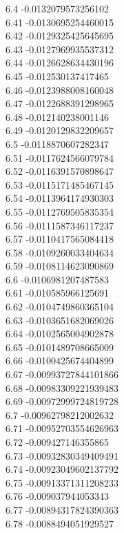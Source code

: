 {6.4	-0.0132079573256102\\
6.41	-0.0130695254460015\\
6.42	-0.0129325425645695\\
6.43	-0.0127969935537312\\
6.44	-0.0126628634430196\\
6.45	-0.012530137417465\\
6.46	-0.0123988008160048\\
6.47	-0.0122688391298965\\
6.48	-0.012140238001146\\
6.49	-0.0120129832209657\\
6.5	-0.0118870607282347\\
6.51	-0.0117624566079784\\
6.52	-0.0116391570898647\\
6.53	-0.0115171485467145\\
6.54	-0.0113964174930303\\
6.55	-0.0112769505835354\\
6.56	-0.0111587346117237\\
6.57	-0.0110417565084418\\
6.58	-0.0109260033404634\\
6.59	-0.0108114623090869\\
6.6	-0.0106981207487583\\
6.61	-0.010585966125691\\
6.62	-0.0104749860365104\\
6.63	-0.0103651682069026\\
6.64	-0.0102565004902878\\
6.65	-0.0101489708665009\\
6.66	-0.0100425674404899\\
6.67	-0.00993727844101866\\
6.68	-0.00983309221939483\\
6.69	-0.00972999724819728\\
6.7	-0.00962798212002632\\
6.71	-0.00952703554626963\\
6.72	-0.009427146355865\\
6.73	-0.00932830349409491\\
6.74	-0.00923049602137792\\
6.75	-0.00913371311208233\\
6.76	-0.009037944053343\\
6.77	-0.00894317824390363\\
6.78	-0.0088494051929527\\
}
